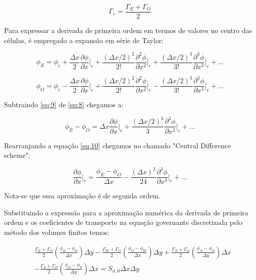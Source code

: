 \begin{equation}
    \Gamma_e = \frac{\Gamma_E + \Gamma_O}{2}
\end{equation}

Para expressar a derivada de primeira ordem em termos de valores no centro das células, é empregado a expansão em série de Taylor:

\begin{equation}
    \label{eq:8}
    \phi_E = \phi_e + \frac{\Delta x}{2} \frac{\partial \phi}{\partial x} \bigg|_e + \frac{(\Delta x / 2)^2}{2!} \frac{\partial^2 \phi}{\partial x^2} \bigg|_e + \frac{(\Delta x / 2)^3}{3!} \frac{\partial^3 \phi}{\partial x^3} \bigg|_e + ...
\end{equation}

\begin{equation}
    \label{eq:9}
    \phi_O = \phi_e - \frac{\Delta x}{2} \frac{\partial \phi}{\partial x} \bigg|_e + \frac{(\Delta x / 2)^2}{2!} \frac{\partial^2 \phi}{\partial x^2} \bigg|_e - \frac{(\Delta x / 2)^3}{3!} \frac{\partial^3 \phi}{\partial x^3} \bigg|_e + ...
\end{equation}

Subtraindo \ref{eq:9} de \ref{eq:8} chegamos a:

\begin{equation}
    \label{eq:10}
    \phi_E - \phi_O = \Delta x \frac{\partial \phi}{\partial x} \bigg|_e + \frac{(\Delta x / 2)^3}{3} \frac{\partial^3 \phi}{\partial x^3} \bigg|_e + ...
\end{equation}

Rearranjando a equação \ref{eq:10} chegamos no chamado "Central Difference scheme":

\begin{equation}
    \label{eq:11}
    \frac{\partial \phi}{\partial x} \bigg|_e = \frac{\phi_E - \phi_O}{\Delta x} - \frac{(\Delta x)^2}{24} \frac{\partial^3 \phi}{\partial x^3} \bigg|_e + ...
\end{equation}

Nota-se que essa aproximação é de segunda ordem.

Substituindo a expressão para a aproximação numérica da derivada de primeira ordem e os coeficientes de transporte na equação governante discretizada pelo método dos volumes finitos temos:

\begin{equation}
    \begin{split}
    \label{eq:12}
    &\frac{\Gamma_E + \Gamma_O}{2} \left( \frac{\phi_E - \phi_O}{\Delta x} \right) \Delta y - \frac{\Gamma_W + \Gamma_O}{2} \left( \frac{\phi_O - \phi_W}{\Delta x} \right) \Delta y + \frac{\Gamma_N + \Gamma_O}{2} \left( \frac{\phi_N - \phi_O}{\Delta y} \right) \Delta x\\
    &- \frac{\Gamma_S + \Gamma_O}{2} \left( \frac{\phi_O - \phi_S}{\Delta y} \right) \Delta x = S_{\phi,0} \Delta x \Delta y
    \end{split}
\end{equation}

